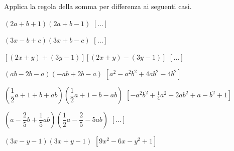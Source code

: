 
\begin{esercizio}[\Ast]
 \label{ese:11.21}
Applica la regola della somma per differenza ai seguenti casi.

\begin{enumeratea}
\item $(2a+b+1)(2a+b-1)$
  \hfill $\left[ \dots \right]$
\item $(3x-b+c)(3x+b-c)$
  \hfill $\left[ \dots \right]$
\item $\left[(2x+y)+(3y-1)\right]\left[(2x+y)-(3y-1)\right]$
  \hfill $\left[ \dots \right]$
\item $(ab-2b-a)(-{ab}+2b-a)$
  \hfill $\left[a^{2}-a^{2}b^{2}+4{ab}^{2}-4b^{2}\right]$
\item $\left(\dfrac{1}{2}a+1+b+ab\right)\left(\dfrac{1}{2}a+1-b-ab\right)$
  \hfill $\left[-a^{2}b^{2}+\frac{1}{4}a^{2}-2{ab}^{2}+a-b^{2}+1\right]$
\item $\left(a-\dfrac{2}{5}b+\dfrac{1}{5}{ab}\right)
       \left(\dfrac{1}{2}a-\dfrac{2}{5}-5{ab}\right)$
  \hfill $\left[ \dots \right]$
\item $(3x-y-1)(3x+y-1)$
  \hfill $\left[9x^{2}-6x-y^{2}+1\right]$
\end{enumeratea}
\end{esercizio}

